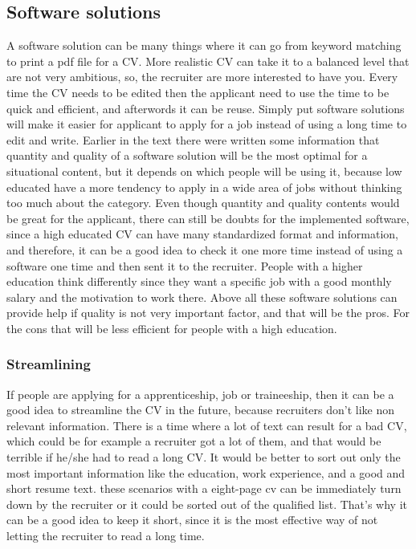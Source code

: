 \subsection{Software solutions}
A software solution can be many things where it can go from keyword matching to print a pdf file for a CV.
More realistic CV can take it to a balanced level that are not very ambitious, 
so, the recruiter are more interested to have you. Every time the CV needs to be edited
then the applicant need to use the time to be quick and efficient, and afterwords it can be reuse.
Simply put software solutions will make it easier for applicant to apply for a job instead of using a long time to edit and write. 
Earlier in the text there were written some information 
that quantity and quality of a software solution will be the most optimal for a situational content,
but it depends on which people will be using it, because low educated have a more tendency to apply
in a wide area of jobs without thinking too much about the category. 
Even though quantity and quality contents would be great for the applicant, 
there can still be doubts for the implemented software, since a high educated CV can have many standardized format and information,
and therefore, it can be a good idea to check it one more time instead of using a software one time and then sent it to the recruiter.
People with a higher education think differently since they want a specific job
with a good monthly salary and the motivation to work there. 
Above all these software solutions can provide help if quality is not very important factor,
and that will be the pros. For the cons that will be less efficient for people with a high education.

\subsubsection{Streamlining}
If people are applying for a apprenticeship, job or traineeship, 
then it can be a good idea to streamline the CV in the future, because recruiters don't like non relevant information.
There is a time where a lot of text can result for a bad CV, which could be for example a recruiter got a lot of them,
and that would be terrible if he/she had to read a long CV. It would be better to sort out only the most important information 
like the education, work experience, and a good and short resume text. 
these scenarios with a eight-page cv can be immediately turn down by the recruiter or 
it could be sorted out of the qualified list.
That's why it can be a good idea to keep it short, 
since it is the most effective way of not letting the recruiter to read a long time.


